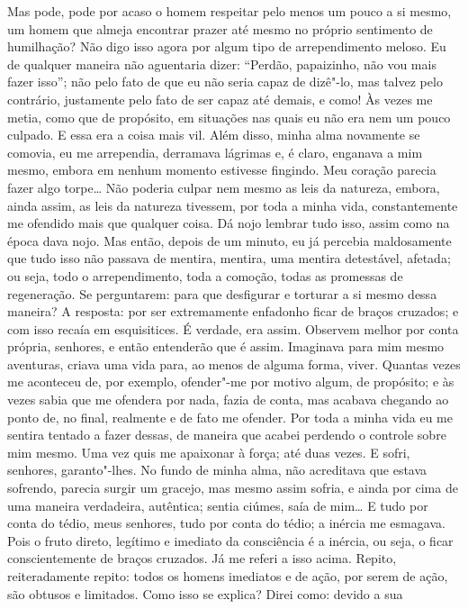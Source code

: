Mas pode, pode por acaso o homem respeitar pelo menos um pouco a si
mesmo, um homem que almeja encontrar prazer até mesmo no próprio sentimento 
de humilhação? Não digo isso agora por algum tipo de
arrependimento meloso. Eu de qualquer maneira não aguentaria dizer:
“Perdão, papaizinho, não vou mais fazer isso”; não pelo fato de que eu
não seria capaz de dizê"-lo, mas talvez pelo contrário, justamente pelo
fato de ser capaz até demais, e como! Às vezes me metia, como que de
propósito, em situações nas quais eu não era nem um pouco culpado. E
essa era a coisa mais vil. Além disso, minha alma novamente se comovia,
eu me arrependia, derramava lágrimas e, é claro, enganava a mim mesmo,
embora em nenhum momento estivesse fingindo. Meu coração parecia fazer
algo torpe\ldots{} Não poderia culpar nem mesmo as leis da natureza, embora,
ainda assim, as leis da natureza tivessem, por toda a minha vida,
constantemente me ofendido mais que qualquer coisa. Dá nojo lembrar
tudo isso, assim como na época dava nojo. Mas então, depois de um
minuto, eu já percebia maldosamente que tudo isso não passava de
mentira, mentira, uma mentira detestável, afetada; ou seja, todo o
arrependimento, toda a comoção, todas as promessas de regeneração. Se
perguntarem: para que desfigurar e torturar a si mesmo dessa maneira? A
resposta: por ser extremamente enfadonho ficar de braços cruzados; e
com isso recaía em esquisitices. É verdade, era assim. Observem melhor
por conta própria, senhores, e então entenderão que é assim. Imaginava
para mim mesmo aventuras, criava uma vida para, ao menos de alguma
forma, viver. Quantas vezes me aconteceu de, por exemplo, ofender"-me
por motivo algum, de propósito; e às vezes sabia que me ofendera por
nada, fazia de conta, mas acabava chegando ao ponto de, no final,
realmente e de fato me ofender. Por toda a minha vida eu me sentira
tentado a fazer dessas, de maneira que acabei perdendo o controle sobre
mim mesmo. Uma vez quis me apaixonar à força; até duas vezes. E sofri,
senhores, garanto"-lhes. No fundo de minha alma, não acreditava que
estava sofrendo, parecia surgir um gracejo, mas mesmo assim sofria, e
ainda por cima de uma maneira verdadeira, autêntica; sentia ciúmes,
saía de mim\ldots{} E tudo por conta do tédio, meus senhores, tudo por conta
do tédio; a inércia me esmagava. Pois o fruto direto, legítimo e
imediato da consciência é a inércia, ou seja, o ficar conscientemente
de braços cruzados. Já me referi a isso acima. Repito, reiteradamente
repito: todos os homens imediatos e de ação, por serem de ação, são
obtusos e limitados. Como isso se explica? Direi como: devido a sua
